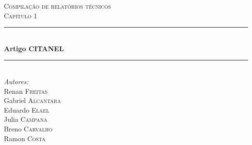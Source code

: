 \begin{titlepage}

\newcommand{\HRule}{\rule{\linewidth}{0.5mm}} %

\center %
 

\textsc{\LARGE Compilação de relatórios técnicos}\\[1.5cm]
\textsc{\Large Capítulo 1}\\[0.5cm] 


\HRule \\[0.4cm]
{ \huge \bfseries Artigo CITANEL}\\[0.4cm] %
\HRule \\[1.5cm]
 


\Large \emph{Autores:}\\
Renan \textsc{Freitas}\\
Gabriel \textsc{Alcantara}\\
Eduardo \textsc{Elael}\\
Julia \textsc{Campana}\\
Breno \textsc{Carvalho}\\
Ramon \textsc{Costa}\\


\end{titlepage}
